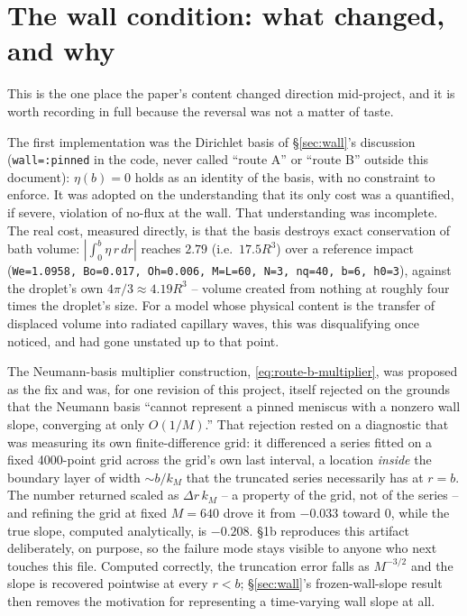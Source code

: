 \section{The wall condition: what changed, and why}
\label{sec:wall-history}

This is the one place the paper's content changed direction mid-project, and it is worth recording in full because the reversal was not a matter of taste.

The first implementation was the Dirichlet basis of \S\ref{sec:wall}'s discussion (\texttt{wall=:pinned} in the code, never called ``route A'' or ``route B'' outside this document): $\eta(b)=0$ holds as an identity of the basis, with no constraint to enforce. It was adopted on the understanding that its only cost was a quantified, if severe, violation of no-flux at the wall. That understanding was incomplete. The real cost, measured directly, is that the basis destroys exact conservation of bath volume: $|\int_0^b\eta\,r\,dr|$ reaches $2.79$ (i.e.\ $17.5R^3$) over a reference impact (\texttt{We=1.0958, Bo=0.017, Oh=0.006, M=L=60, N=3, nq=40, b=6, h0=3}), against the droplet's own $4\pi/3\approx4.19R^3$ -- volume created from nothing at roughly four times the droplet's size. For a model whose physical content is the transfer of displaced volume into radiated capillary waves, this was disqualifying once noticed, and had gone unstated up to that point.

The Neumann-basis multiplier construction, \eqref{eq:route-b-multiplier}, was proposed as the fix and was, for one revision of this project, itself rejected on the grounds that the Neumann basis ``cannot represent a pinned meniscus with a nonzero wall slope, converging at only $O(1/M)$.'' That rejection rested on a diagnostic that was measuring its own finite-difference grid: it differenced a series fitted on a fixed 4000-point grid across the grid's own last interval, a location \emph{inside} the boundary layer of width $\sim b/k_M$ that the truncated series necessarily has at $r=b$. The number returned scaled as $\Delta r\,k_M$ -- a property of the grid, not of the series -- and refining the grid at fixed $M=640$ drove it from $-0.033$ toward $0$, while the true slope, computed analytically, is $-0.208$.  \S1b reproduces this artifact deliberately, on purpose, so the failure mode stays visible to anyone who next touches this file. Computed correctly, the truncation error falls as $M^{-3/2}$ and the slope is recovered pointwise at every $r<b$; \S\ref{sec:wall}'s frozen-wall-slope result then removes the motivation for representing a time-varying wall slope at all.

